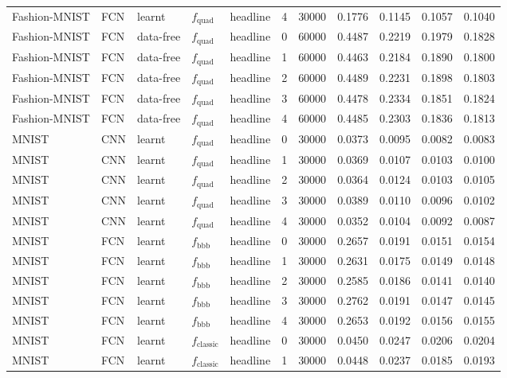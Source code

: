 {\begin{longtable}[]{@{}lllllr r r r r r@{}}
Fashion-MNIST & FCN & learnt & $f_{\text{quad}}$ & headline & 4 & 30000 & 0.1776 & 0.1145 & 0.1057 & 0.1040 \\
\addlinespace[2pt]
Fashion-MNIST & FCN & data-free & $f_{\text{quad}}$ & headline & 0 & 60000 & 0.4487 & 0.2219 & 0.1979 & 0.1828 \\
Fashion-MNIST & FCN & data-free & $f_{\text{quad}}$ & headline & 1 & 60000 & 0.4463 & 0.2184 & 0.1890 & 0.1800 \\
Fashion-MNIST & FCN & data-free & $f_{\text{quad}}$ & headline & 2 & 60000 & 0.4489 & 0.2231 & 0.1898 & 0.1803 \\
Fashion-MNIST & FCN & data-free & $f_{\text{quad}}$ & headline & 3 & 60000 & 0.4478 & 0.2334 & 0.1851 & 0.1824 \\
Fashion-MNIST & FCN & data-free & $f_{\text{quad}}$ & headline & 4 & 60000 & 0.4485 & 0.2303 & 0.1836 & 0.1813 \\
\addlinespace[2pt]
MNIST & CNN & learnt & $f_{\text{quad}}$ & headline & 0 & 30000 & 0.0373 & 0.0095 & 0.0082 & 0.0083 \\
MNIST & CNN & learnt & $f_{\text{quad}}$ & headline & 1 & 30000 & 0.0369 & 0.0107 & 0.0103 & 0.0100 \\
MNIST & CNN & learnt & $f_{\text{quad}}$ & headline & 2 & 30000 & 0.0364 & 0.0124 & 0.0103 & 0.0105 \\
MNIST & CNN & learnt & $f_{\text{quad}}$ & headline & 3 & 30000 & 0.0389 & 0.0110 & 0.0096 & 0.0102 \\
MNIST & CNN & learnt & $f_{\text{quad}}$ & headline & 4 & 30000 & 0.0352 & 0.0104 & 0.0092 & 0.0087 \\
\addlinespace[2pt]
MNIST & FCN & learnt & $f_{\text{bbb}}$ & headline & 0 & 30000 & 0.2657 & 0.0191 & 0.0151 & 0.0154 \\
MNIST & FCN & learnt & $f_{\text{bbb}}$ & headline & 1 & 30000 & 0.2631 & 0.0175 & 0.0149 & 0.0148 \\
MNIST & FCN & learnt & $f_{\text{bbb}}$ & headline & 2 & 30000 & 0.2585 & 0.0186 & 0.0141 & 0.0140 \\
MNIST & FCN & learnt & $f_{\text{bbb}}$ & headline & 3 & 30000 & 0.2762 & 0.0191 & 0.0147 & 0.0145 \\
MNIST & FCN & learnt & $f_{\text{bbb}}$ & headline & 4 & 30000 & 0.2653 & 0.0192 & 0.0156 & 0.0155 \\
\addlinespace[2pt]
MNIST & FCN & learnt & $f_{\text{classic}}$ & headline & 0 & 30000 & 0.0450 & 0.0247 & 0.0206 & 0.0204 \\
MNIST & FCN & learnt & $f_{\text{classic}}$ & headline & 1 & 30000 & 0.0448 & 0.0237 & 0.0185 & 0.0193 \\

\end{longtable}}
